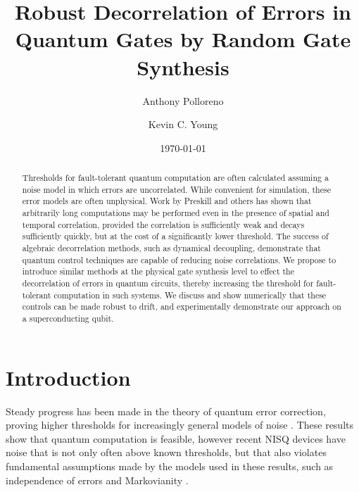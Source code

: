 \documentclass[aps,nofootinbib,pra,notitlepage,twocolumn]{revtex4-1}
\begin{document}
\title{Robust Decorrelation of Errors in Quantum Gates by Random Gate Synthesis}

\author{Anthony Polloreno}

\author{Kevin C. Young}

\date{\today}

\begin{abstract}
Thresholds for fault-tolerant quantum computation are often calculated assuming a noise model in which errors are uncorrelated. While convenient for simulation, these error models are often unphysical. Work by Preskill and others has shown that arbitrarily long computations may be performed even in the presence of spatial and temporal correlation, provided the correlation is sufficiently weak and decays sufficiently quickly, but at the cost of a significantly lower threshold. The success of algebraic decorrelation methods, such as dynamical decoupling, demonstrate that quantum control techniques are capable of reducing noise correlations. We propose to introduce similar methods at the physical gate synthesis level to effect the decorrelation of errors in quantum circuits, thereby increasing the threshold for fault-tolerant computation in such systems. We discuss and show numerically that these controls can be made robust to drift, and experimentally demonstrate our approach on a superconducting qubit.
\end{abstract}

\pacs{}

\maketitle

\section{Introduction}

Steady progress has been made in the theory of quantum error correction, proving higher thresholds for increasingly general models of noise \cite{Aharonov2006, 1609.00510, https://doi.org/10.7907/z96m34sc, Kubica2018, Wang2003, Campbell2017}. These results show that quantum computation is feasible, however recent NISQ \cite{Preskill2018} devices have noise that is not only often above known thresholds, but that also violates fundamental assumptions made by the models used in these results\cite{Kelly2018, BlumeKohout2017, Klimov2018}, such as independence of errors\cite{Knill1998} and Markovianity \cite{Kitaev1997}. 
\end{document}
